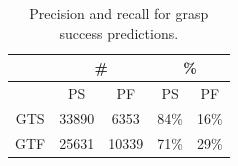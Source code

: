 \begin{table}[h]
\centering
\caption{Precision and recall for grasp success predictions.}
\label{fig:predictions}
\begin{tabular}{|c|c|c|c|c|}
\hline
    & \multicolumn{2}{c|}{\#} & \multicolumn{2}{c|}{\%} \\ \hline
    & PS         & PF         & PS         & PF         \\ \hline
GTS & 33890      & 6353       & 84\%       & 16\%       \\ \hline
GTF & 25631      & 10339     & 71\%       & 29\%       \\ \hline
\end{tabular}
\end{table}
